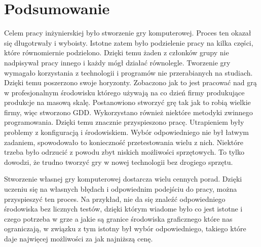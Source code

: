 \chapter{Podsumowanie}

Celem pracy inżynierskiej było stworzenie gry komputerowej. Proces ten okazał się długotrwały i wyboisty. Istotne zatem było podzielenie pracy na kilka części, które równomiernie podzielono. Dzięki temu żaden z członków grupy nie nadpisywał pracy innego i każdy mógł działać równolegle. Tworzenie gry wymagało korzystania z technologii i programów nie przerabianych na studiach. Dzięki temu poszerzono swoje horyzonty. Zobaczono jak to jest pracować nad grą w profesjonalnym środowisku którego używają na co dzień firmy produkujące produkcje na masową skalę. Postanowiono stworzyć grę tak jak to robią wielkie firmy, więc stworzono GDD. Wykorzystano również niektóre metodyki zwinnego programowania. Dzięki temu znacznie przyspieszono pracę. Utrapieniem były problemy z konfiguracją i środowiskiem. Wybór odpowiedniego nie był łatwym zadaniem, spowodowało to konieczność przetestowania wielu z nich. Niektóre trzeba było odrzucić z powodu zbyt niskich możliwości sprzętowych. To tylko dowodzi, że trudno tworzyć gry w nowej technologii bez drogiego sprzętu.

Stworzenie własnej gry komputerowej dostarcza wielu cennych porad. Dzięki uczeniu się na własnych błędach i odpowiednim podejściu do pracy, można przyspieszyć ten proces. Na przykład, nie da się znaleźć odpowiedniego środowiska bez licznych testów, dzięki którym wiadome było co jest istotne i czego potrzeba w grze a jakie są granice środowiska graficznego które nas ograniczają, w związku z tym istotny był wybór odpowiedniego, takiego które daje najwięcej możliwości za jak najniższą cenę.